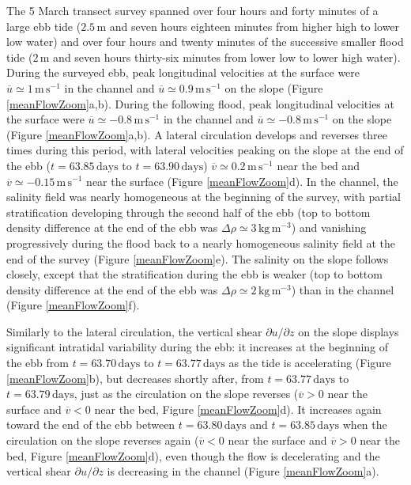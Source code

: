The 5 March transect survey spanned over four hours and forty minutes of a large ebb tide ($2.5\,\mathrm{m}$ and seven hours eighteen minutes from higher high to lower low water) and over four hours and twenty minutes of the successive smaller flood tide ($2\,\mathrm{m}$ and seven hours thirty-six minutes from lower low to lower high water). During the surveyed ebb, peak longitudinal velocities at the surface were $\overline{u} \simeq 1 \, \mathrm{m}\,\mathrm{s}^{-1}$ in the channel and $\overline{u} \simeq 0.9 \, \mathrm{m}\,\mathrm{s}^{-1}$ on the slope (Figure \ref{meanFlowZoom}a,b). During the following flood, peak longitudinal velocities at the surface were $\overline{u} \simeq -0.8 \, \mathrm{m}\,\mathrm{s}^{-1}$ in the channel and $\overline{u} \simeq -0.8 \, \mathrm{m}\,\mathrm{s}^{-1}$ on the slope (Figure \ref{meanFlowZoom}a,b). A lateral circulation develops and reverses three times during this period, with lateral velocities peaking on the slope at the end of the ebb ($t = 63.85 \, \mathrm{days}$ to $t = 63.90 \, \mathrm{days}$) $\overline{v} \simeq 0.2 \, \mathrm{m}\,\mathrm{s}^{-1}$ near the bed and $\overline{v} \simeq -0.15 \, \mathrm{m}\,\mathrm{s}^{-1}$ near the surface (Figure \ref{meanFlowZoom}d). In the channel, the salinity field was nearly homogeneous at the beginning of the survey, with partial stratification developing through the second half of the ebb (top to bottom density difference at the end of the ebb was $\Delta \rho \simeq 3 \, \mathrm{kg} \, \mathrm{m}^{-3}$) and vanishing progressively during the flood back to a nearly homogeneous salinity field at the end of the survey (Figure \ref{meanFlowZoom}e). The salinity on the slope follows closely, except that the stratification during the ebb is weaker (top to bottom density difference at the end of the ebb was $\Delta \rho \simeq 2 \, \mathrm{kg} \, \mathrm{m}^{-3}$) than in the channel (Figure \ref{meanFlowZoom}f).

Similarly to the lateral circulation, the vertical shear $\partial u / \partial z$ on the slope displays significant intratidal variability during the ebb: it increases at the beginning of the ebb from $t = 63.70 \, \mathrm{days}$ to $t = 63.77 \, \mathrm{days}$  as the tide is accelerating (Figure \ref{meanFlowZoom}b), but decreases shortly after, from $t = 63.77 \, \mathrm{days}$ to $t = 63.79 \, \mathrm{days}$, just as the circulation on the slope reverses ($\overline{v} > 0$ near the surface and $\overline{v} < 0$ near the bed, Figure \ref{meanFlowZoom}d). It increases again toward the end of the ebb between $t = 63.80 \, \mathrm{days}$ and $t = 63.85 \, \mathrm{days}$ when the circulation on the slope reverses again ($\overline{v} < 0$ near the surface and $\overline{v} > 0$ near the bed, Figure \ref{meanFlowZoom}d), even though the flow is decelerating and the vertical shear $\partial u / \partial z$ is decreasing in the channel (Figure \ref{meanFlowZoom}a).


